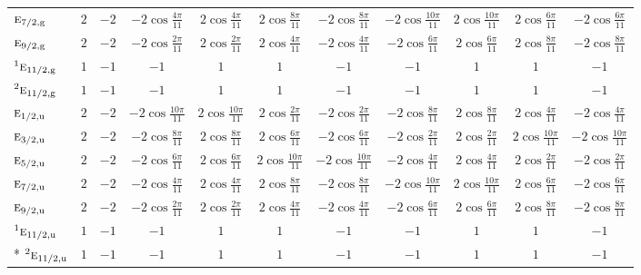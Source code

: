\documentclass[10pt,a4paper]{article}
\numberwithin{equation}{section}
\newcommand{\irr}[1]{\text{\normalfont\scshape #1}}
\newcommand{\conjpair}[1]{{}^{#1}}
\newcommand{\ptag}[1]{\mathrm{#1}}
\begin{document}
{{\begin{longtable}{@{}lcccccccccc@{}}
$\irr{e}_{7/2,\ptag{g}}$ & $2$ & $-2$ & $-2\cos\tfrac{4\pi}{11}$ & $2\cos\tfrac{4\pi}{11}$ & $2\cos\tfrac{8\pi}{11}$ & $-2\cos\tfrac{8\pi}{11}$ & $-2\cos\tfrac{10\pi}{11}$ & $2\cos\tfrac{10\pi}{11}$ & $2\cos\tfrac{6\pi}{11}$ & $-2\cos\tfrac{6\pi}{11}$\\
$\irr{e}_{9/2,\ptag{g}}$ & $2$ & $-2$ & $-2\cos\tfrac{2\pi}{11}$ & $2\cos\tfrac{2\pi}{11}$ & $2\cos\tfrac{4\pi}{11}$ & $-2\cos\tfrac{4\pi}{11}$ & $-2\cos\tfrac{6\pi}{11}$ & $2\cos\tfrac{6\pi}{11}$ & $2\cos\tfrac{8\pi}{11}$ & $-2\cos\tfrac{8\pi}{11}$\\
$\conjpair{1}\irr{e}_{11/2,\ptag{g}}$ & $1$ & $-1$ & $-1$ & $1$ & $1$ & $-1$ & $-1$ & $1$ & $1$ & $-1$\\
$\conjpair{2}\irr{e}_{11/2,\ptag{g}}$ & $1$ & $-1$ & $-1$ & $1$ & $1$ & $-1$ & $-1$ & $1$ & $1$ & $-1$\\
$\irr{e}_{1/2,\ptag{u}}$ & $2$ & $-2$ & $-2\cos\tfrac{10\pi}{11}$ & $2\cos\tfrac{10\pi}{11}$ & $2\cos\tfrac{2\pi}{11}$ & $-2\cos\tfrac{2\pi}{11}$ & $-2\cos\tfrac{8\pi}{11}$ & $2\cos\tfrac{8\pi}{11}$ & $2\cos\tfrac{4\pi}{11}$ & $-2\cos\tfrac{4\pi}{11}$\\
$\irr{e}_{3/2,\ptag{u}}$ & $2$ & $-2$ & $-2\cos\tfrac{8\pi}{11}$ & $2\cos\tfrac{8\pi}{11}$ & $2\cos\tfrac{6\pi}{11}$ & $-2\cos\tfrac{6\pi}{11}$ & $-2\cos\tfrac{2\pi}{11}$ & $2\cos\tfrac{2\pi}{11}$ & $2\cos\tfrac{10\pi}{11}$ & $-2\cos\tfrac{10\pi}{11}$\\
$\irr{e}_{5/2,\ptag{u}}$ & $2$ & $-2$ & $-2\cos\tfrac{6\pi}{11}$ & $2\cos\tfrac{6\pi}{11}$ & $2\cos\tfrac{10\pi}{11}$ & $-2\cos\tfrac{10\pi}{11}$ & $-2\cos\tfrac{4\pi}{11}$ & $2\cos\tfrac{4\pi}{11}$ & $2\cos\tfrac{2\pi}{11}$ & $-2\cos\tfrac{2\pi}{11}$\\
$\irr{e}_{7/2,\ptag{u}}$ & $2$ & $-2$ & $-2\cos\tfrac{4\pi}{11}$ & $2\cos\tfrac{4\pi}{11}$ & $2\cos\tfrac{8\pi}{11}$ & $-2\cos\tfrac{8\pi}{11}$ & $-2\cos\tfrac{10\pi}{11}$ & $2\cos\tfrac{10\pi}{11}$ & $2\cos\tfrac{6\pi}{11}$ & $-2\cos\tfrac{6\pi}{11}$\\
$\irr{e}_{9/2,\ptag{u}}$ & $2$ & $-2$ & $-2\cos\tfrac{2\pi}{11}$ & $2\cos\tfrac{2\pi}{11}$ & $2\cos\tfrac{4\pi}{11}$ & $-2\cos\tfrac{4\pi}{11}$ & $-2\cos\tfrac{6\pi}{11}$ & $2\cos\tfrac{6\pi}{11}$ & $2\cos\tfrac{8\pi}{11}$ & $-2\cos\tfrac{8\pi}{11}$\\
$\conjpair{1}\irr{e}_{11/2,\ptag{u}}$ & $1$ & $-1$ & $-1$ & $1$ & $1$ & $-1$ & $-1$ & $1$ & $1$ & $-1$\\*
$\conjpair{2}\irr{e}_{11/2,\ptag{u}}$ & $1$ & $-1$ & $-1$ & $1$ & $1$ & $-1$ & $-1$ & $1$ & $1$ & $-1$\\
\bottomrule\end{longtable}}}
\end{document}
